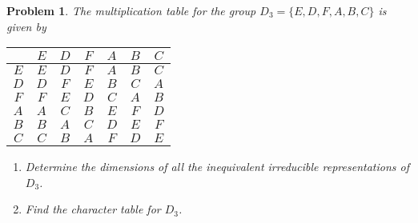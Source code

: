 \documentclass[UTF8,10pt,a4paper]{article}
\theoremstyle{Problem}
\newtheorem{prob}{Problem}
\theoremstyle{Solution}
\begin{document}
\thispagestyle{FirstPageStyle}
\begin{prob}
    The multiplication table for the group $D_3=\{E,D,F,A,B,C\}$ is given by
    \begin{table}[h]
        \centering
        \begin{tabular}{c|cccccc}
         & $E$ & $D$ & $F$ & $A$ & $B$ & $C$ \\ \hline
        $E$ & $E$ & $D$ & $F$ & $A$ & $B$ & $C$ \\
        $D$ & $D$ & $F$ & $E$ & $B$ & $C$ & $A$ \\
        $F$ & $F$ & $E$ & $D$ & $C$ & $A$ & $B$ \\
        $A$ & $A$ & $C$ & $B$ & $E$ & $F$ & $D$ \\
        $B$ & $B$ & $A$ & $C$ & $D$ & $E$ & $F$ \\
        $C$ & $C$ & $B$ & $A$ & $F$ & $D$ & $E$
        \end{tabular}
        \end{table}
        \begin{enumerate}
            \item[(a)] Determine the dimensions of all the inequivalent irreducible representations of $D_3$.
            \item[(b)] Find the character table for $D_3$.
        \end{enumerate}
\end{prob}
\end{document}
